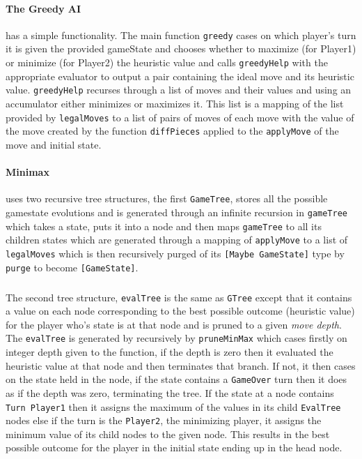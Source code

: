 \documentclass[11pt]{article}
\begin{document}
\paragraph{The Greedy AI} has a simple functionality. The main function \verb|greedy| cases on which player's turn it is given the provided gameState and chooses whether to maximize (for Player1) or minimize (for Player2) the heuristic value and calls \verb|greedyHelp| with the appropriate evaluator to output a pair containing the ideal move and its heuristic value. \verb|greedyHelp| recurses through a list of moves and their values and using an accumulator either minimizes or maximizes it. This list is a mapping of the list provided by \verb|legalMoves| to a list of pairs of moves of each move with the value of the move created by the function \verb|diffPieces| applied to the \verb|applyMove| of the move and initial state.

\paragraph{Minimax} uses two recursive tree structures, the first \verb|GameTree|, stores all the possible gamestate evolutions and is generated through an infinite recursion in \verb|gameTree| which takes a state, puts it into a node and then maps \verb|gameTree| to all its children states which are generated through a mapping of \verb|applyMove| to a list of \verb|legalMoves| which is then recursively purged of its \verb|[Maybe GameState]| type by \verb|purge| to become \verb|[GameState]|.

\subparagraph*{}The second tree structure, \verb|evalTree| is the same as \verb|GTree| except that it contains a value on each node corresponding to the best possible outcome (heuristic value) for the player who's state is at that node and is pruned to a given \textit{move depth}. The \verb|evalTree| is generated by recursively by \verb|pruneMinMax| which cases firstly on integer depth given to the function, if the depth is zero then it evaluated the heuristic value at that node and then terminates that branch. If not, it then cases on the state held in the node, if the state contains a \verb|GameOver| turn then it does as if the depth was zero, terminating the tree. If the state at a node contains \verb|Turn Player1| then it assigns the maximum of the values in its child \verb|EvalTree| nodes else if the turn is the \verb|Player2|, the minimizing player, it assigns the minimum value of its child nodes to the given node. This results in the best possible outcome for the player in the initial state ending up in the head node.
\end{document}

